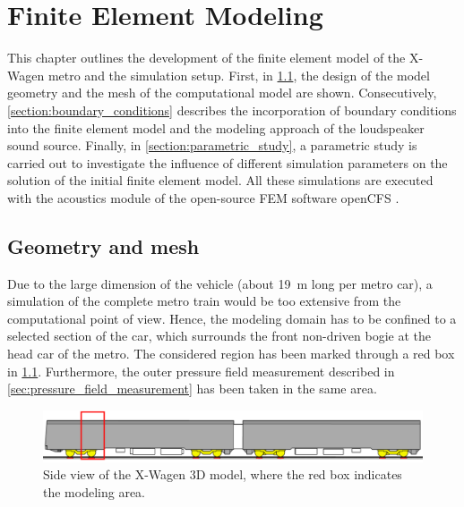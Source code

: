\chapter{Finite Element Modeling}
\label{chap:FEM}

This chapter outlines the development of the finite element model of the X-Wagen metro and the simulation setup. First, in \cref{section:geometry}, the design of the model geometry and the mesh of the computational model are shown.
Consecutively, \cref{section:boundary_conditions} describes the incorporation of boundary conditions into the finite element model and the modeling approach of the loudspeaker sound source. 
Finally, in \cref{section:parametric_study}, a parametric study is carried out to investigate the influence of different simulation parameters on the solution of the initial finite element model.
All these simulations are executed with the acoustics module of the open-source FEM software openCFS \cite{opencfs}.


\section{Geometry and mesh}
\label{section:geometry}

Due to the large dimension of the vehicle (about \SI{19}{\meter} long per metro car), a simulation of the complete metro train would be too extensive from the computational point of view. Hence, the modeling domain has to be confined to a selected section of the car, which surrounds the front non-driven bogie at the head car of the metro. The considered region has been marked through a red box in \cref{fig:red_box}. Furthermore, the outer pressure field measurement described in \cref{sec:pressure_field_measurement} has been taken in the same area.
\begin{figure}
	\centering
	\includegraphics[width=\textwidth]{fig/chap4/geometry/model_area.png}
	\caption{Side view of the X-Wagen 3D model, where the red box indicates the modeling area.}
	\label{fig:red_box}
\end{figure}

